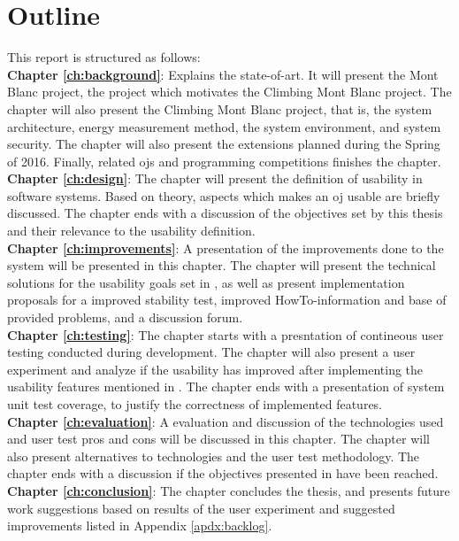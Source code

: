 

\section{Outline}
\label{sec:out}
This report is structured as follows:\\

\textbf{Chapter \ref{ch:background}}: Explains the state-of-art. It will present the Mont Blanc project, the project which motivates the Climbing Mont Blanc project. The chapter will also present the Climbing Mont Blanc project, that is, the system architecture, energy measurement method, the system environment, and system security. The chapter will also present the extensions planned during the Spring of 2016. Finally, related \glspl{oj} and programming competitions finishes the chapter. \\

\textbf{Chapter \ref{ch:design}}: The chapter will present the definition of usability in software systems. Based on theory, aspects which makes an \gls{oj} usable are briefly discussed. The chapter ends with a discussion of the objectives set by this thesis and their relevance to the usability definition. \\

\textbf{Chapter \ref{ch:improvements}}: A presentation of the improvements done to the system will be presented in this chapter. The chapter will present the technical solutions for the usability goals set in , as well as present implementation proposals for a improved stability test, improved HowTo-information and base of provided problems, and a discussion forum. \\

\textbf{Chapter \ref{ch:testing}}: The chapter starts with a presntation of contineous user testing conducted during development. The chapter will also present a user experiment and analyze if the usability has improved after implementing the usability features mentioned in . The chapter ends with a presentation of system unit test coverage, to justify the correctness of implemented features. \\

\textbf{Chapter \ref{ch:evaluation}}: A evaluation and discussion of the technologies used and user test pros and cons will be discussed in this chapter. The chapter will also present alternatives to technologies and the user test methodology. The chapter ends with a discussion if the objectives presented in  have been reached. \\

\textbf{Chapter \ref{ch:conclusion}}: The chapter concludes the thesis, and presents future work suggestions based on results of the user experiment and suggested improvements listed in Appendix \ref{apdx:backlog}.




